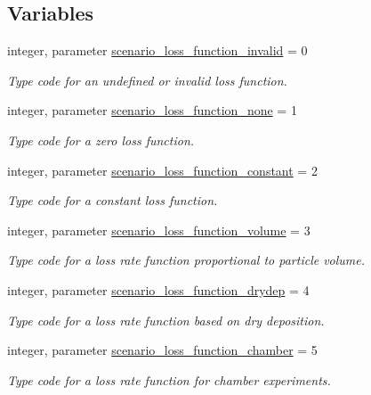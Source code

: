 \subsection*{Variables}
\begin{DoxyCompactItemize}
\item 
integer, parameter \mbox{\hyperlink{namespacepmc__scenario_a2b2e63100da1707d0529fc22239daa8e}{scenario\+\_\+loss\+\_\+function\+\_\+invalid}} = 0
\begin{DoxyCompactList}\small\item\em Type code for an undefined or invalid loss function. \end{DoxyCompactList}\item 
integer, parameter \mbox{\hyperlink{namespacepmc__scenario_a698827c1bd003fdbf988b3813305322e}{scenario\+\_\+loss\+\_\+function\+\_\+none}} = 1
\begin{DoxyCompactList}\small\item\em Type code for a zero loss function. \end{DoxyCompactList}\item 
integer, parameter \mbox{\hyperlink{namespacepmc__scenario_a860cf47bb81e54f7ef8bc666bf7c76f0}{scenario\+\_\+loss\+\_\+function\+\_\+constant}} = 2
\begin{DoxyCompactList}\small\item\em Type code for a constant loss function. \end{DoxyCompactList}\item 
integer, parameter \mbox{\hyperlink{namespacepmc__scenario_ad3122dfa9b3c59624cdef63b4ebd807d}{scenario\+\_\+loss\+\_\+function\+\_\+volume}} = 3
\begin{DoxyCompactList}\small\item\em Type code for a loss rate function proportional to particle volume. \end{DoxyCompactList}\item 
integer, parameter \mbox{\hyperlink{namespacepmc__scenario_a44b0747589f4aac5fb700b51d0861cd0}{scenario\+\_\+loss\+\_\+function\+\_\+drydep}} = 4
\begin{DoxyCompactList}\small\item\em Type code for a loss rate function based on dry deposition. \end{DoxyCompactList}\item 
integer, parameter \mbox{\hyperlink{namespacepmc__scenario_a0e9c46d308800f28d977960a1d5918ae}{scenario\+\_\+loss\+\_\+function\+\_\+chamber}} = 5
\begin{DoxyCompactList}\small\item\em Type code for a loss rate function for chamber experiments. \end{DoxyCompactList}\item 

\end{DoxyCompactItemize}

